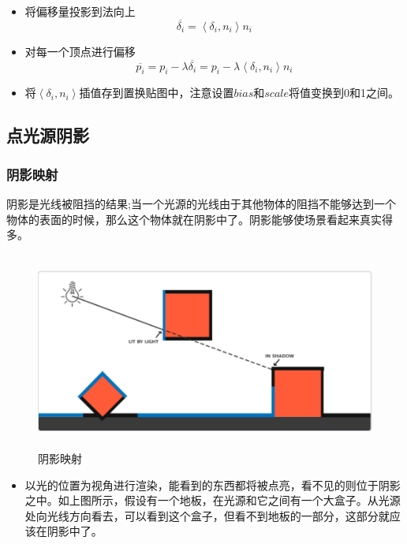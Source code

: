 \documentclass{article}
\begin{document}
    \begin{itemize}
 	\item 将偏移量投影到法向上
 	$$  \overline{\delta_i}= \left<\delta_i,n_i \right>n_i $$
 \end{itemize}

     \begin{itemize}
    	\item 对每一个顶点进行偏移
    	$$  \overline{p_i}= p_i - \lambda\overline{\delta_i} = p_i - \lambda  \left<\delta_i,n_i \right>n_i    $$
    \end{itemize}

 \begin{itemize}
	\item 将$\left<\delta_i,n_i \right>$插值存到置换贴图中，注意设置$bias$和$scale$将值变换到0和1之间。
\end{itemize}
	
	   \subsection{点光源阴影}
	   \subsubsection{阴影映射}
	 阴影是光线被阻挡的结果;当一个光源的光线由于其他物体的阻挡不能够达到一个物体的表面的时候，那么这个物体就在阴影中了。阴影能够使场景看起来真实得多。
	 \begin{figure}[H]
	 	\begin{center}
	 		\includegraphics[width=17cm,height=6.5cm]{shadow mapping}
	 		\caption{阴影映射}	\label{yingshe.label}
	 	\end{center}
	 \end{figure}
 
  \begin{itemize}
 	\item 以光的位置为视角进行渲染，能看到的东西都将被点亮，看不见的则位于阴影之中。如上图所示，假设有一个地板，在光源和它之间有一个大盒子。从光源处向光线方向看去，可以看到这个盒子，但看不到地板的一部分，这部分就应该在阴影中了。
 \end{itemize}
\end{document}
